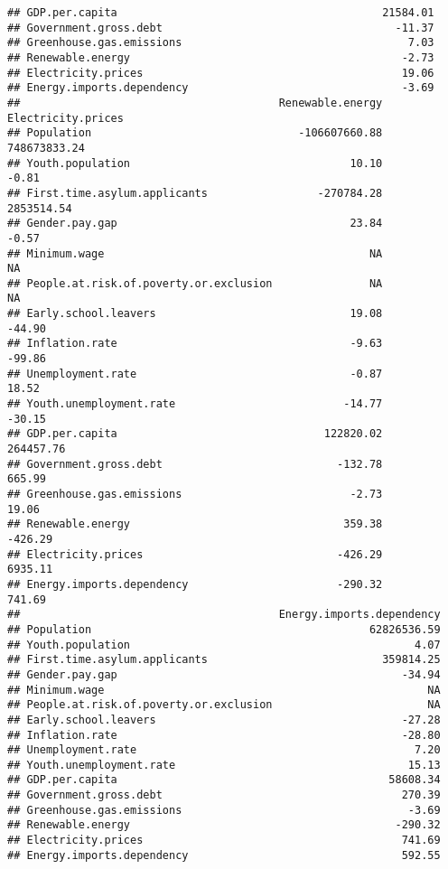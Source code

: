 \documentclass[
]{article}
\begin{document}
\begin{verbatim}
## GDP.per.capita                                         21584.01
## Government.gross.debt                                    -11.37
## Greenhouse.gas.emissions                                   7.03
## Renewable.energy                                          -2.73
## Electricity.prices                                        19.06
## Energy.imports.dependency                                 -3.69
##                                        Renewable.energy Electricity.prices
## Population                                -106607660.88       748673833.24
## Youth.population                                  10.10              -0.81
## First.time.asylum.applicants                 -270784.28         2853514.54
## Gender.pay.gap                                    23.84              -0.57
## Minimum.wage                                         NA                 NA
## People.at.risk.of.poverty.or.exclusion               NA                 NA
## Early.school.leavers                              19.08             -44.90
## Inflation.rate                                    -9.63             -99.86
## Unemployment.rate                                 -0.87              18.52
## Youth.unemployment.rate                          -14.77             -30.15
## GDP.per.capita                                122820.02          264457.76
## Government.gross.debt                           -132.78             665.99
## Greenhouse.gas.emissions                          -2.73              19.06
## Renewable.energy                                 359.38            -426.29
## Electricity.prices                              -426.29            6935.11
## Energy.imports.dependency                       -290.32             741.69
##                                        Energy.imports.dependency
## Population                                           62826536.59
## Youth.population                                            4.07
## First.time.asylum.applicants                           359814.25
## Gender.pay.gap                                            -34.94
## Minimum.wage                                                  NA
## People.at.risk.of.poverty.or.exclusion                        NA
## Early.school.leavers                                      -27.28
## Inflation.rate                                            -28.80
## Unemployment.rate                                           7.20
## Youth.unemployment.rate                                    15.13
## GDP.per.capita                                          58608.34
## Government.gross.debt                                     270.39
## Greenhouse.gas.emissions                                   -3.69
## Renewable.energy                                         -290.32
## Electricity.prices                                        741.69
## Energy.imports.dependency                                 592.55
\end{verbatim}
\end{document}
